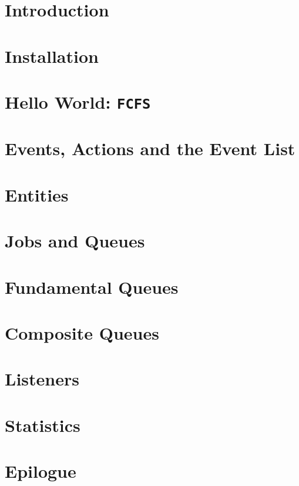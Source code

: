 \documentclass[12pt]{book}
\begin{document}
\chapter{Introduction}
\label{chap:intro}


\chapter{Installation}
\label{chap:install}


\chapter{Hello World: \texttt{\bf FCFS}}
\label{chap:hello-world}


\chapter{Events, Actions and the Event List}
\label{chap:events-actions-event-list}


\chapter{Entities}
\label{chap:entities}


\chapter{Jobs and Queues}
\label{chap:jobs-and-queues}


\chapter{Fundamental Queues}
\label{chap:fundamental-queues}


\chapter{Composite Queues}
\label{chap:composite-queues}


\chapter{Listeners}
\label{chap:listeners}


\chapter{Statistics}
\label{chap:statistics}


\chapter{Epilogue}
\label{chap:epilogue}


{}

\end{document}
